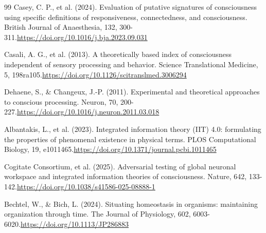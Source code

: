 \documentclass[11pt,letterpaper]{article}
\begin{document}
\begin{thebibliography}{99}
 Casey, C. P., et al. (2024). Evaluation of putative signatures of consciousness using specific definitions of responsiveness, connectedness, and consciousness. British Journal of Anaesthesia, 132, 300-311.\newline \href{https://doi.org/10.1016/j.bja.2023.09.031}{https://doi.org/10.1016/j.bja.2023.09.031}

 Casali, A. G., et al. (2013). A theoretically based index of consciousness independent of sensory processing and behavior. Science Translational Medicine, 5, 198ra105.\newline \href{https://doi.org/10.1126/scitranslmed.3006294}{https://doi.org/10.1126/scitranslmed.3006294}

 Dehaene, S., \& Changeux, J.-P. (2011). Experimental and theoretical approaches to conscious processing. Neuron, 70, 200-227.\newline \href{https://doi.org/10.1016/j.neuron.2011.03.018}{https://doi.org/10.1016/j.neuron.2011.03.018}

 Albantakis, L., et al. (2023). Integrated information theory (IIT) 4.0: formulating the properties of phenomenal existence in physical terms. PLOS Computational Biology, 19, e1011465.\newline \href{https://doi.org/10.1371/journal.pcbi.1011465}{https://doi.org/10.1371/journal.pcbi.1011465}

 Cogitate Consortium, et al. (2025). Adversarial testing of global neuronal workspace and integrated information theories of consciousness. Nature, 642, 133-142.\newline \href{https://doi.org/10.1038/s41586-025-08888-1}{https://doi.org/10.1038/s41586-025-08888-1}

 Bechtel, W., \& Bich, L. (2024). Situating homeostasis in organisms: maintaining organization through time. The Journal of Physiology, 602, 6003-6020.\newline \href{https://doi.org/10.1113/JP286883}{https://doi.org/10.1113/JP286883}

\end{thebibliography}
\end{document}
